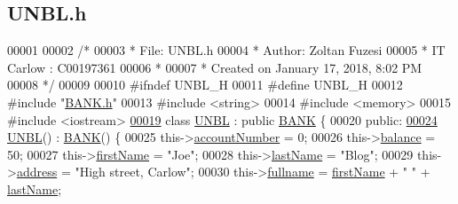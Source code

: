 \hypertarget{_u_n_b_l_8h_source}{}\subsection{U\+N\+B\+L.\+h}

\begin{DoxyCode}
00001 
00002 \textcolor{comment}{/* }
00003 \textcolor{comment}{ * File:   UNBL.h}
00004 \textcolor{comment}{ * Author: Zoltan Fuzesi}
00005 \textcolor{comment}{ * IT Carlow : C00197361}
00006 \textcolor{comment}{ *}
00007 \textcolor{comment}{ * Created on January 17, 2018, 8:02 PM}
00008 \textcolor{comment}{ */}
00009 
00010 \textcolor{preprocessor}{#ifndef UNBL\_H}
00011 \textcolor{preprocessor}{#define UNBL\_H}
00012 \textcolor{preprocessor}{#include "\hyperlink{_b_a_n_k_8h}{BANK.h}"}
00013 \textcolor{preprocessor}{#include <string>}
00014 \textcolor{preprocessor}{#include <memory>}
00015 \textcolor{preprocessor}{#include <iostream>}
\hypertarget{_u_n_b_l_8h_source.tex_l00019}{}\hyperlink{class_u_n_b_l}{00019} \textcolor{keyword}{class }\hyperlink{class_u_n_b_l}{UNBL} : \textcolor{keyword}{public} \hyperlink{class_b_a_n_k}{BANK} \{
00020 \textcolor{keyword}{public}:
\hypertarget{_u_n_b_l_8h_source.tex_l00024}{}\hyperlink{class_u_n_b_l_aa264ef64c453e6049b3d4c984d84d1de_aa264ef64c453e6049b3d4c984d84d1de}{00024}     \hyperlink{class_u_n_b_l_aa264ef64c453e6049b3d4c984d84d1de_aa264ef64c453e6049b3d4c984d84d1de}{UNBL}() : \hyperlink{class_b_a_n_k}{BANK}() \{
00025         this->\hyperlink{class_u_n_b_l_a90763c3044159862bcb9cd51d6b09f34_a90763c3044159862bcb9cd51d6b09f34}{accountNumber} = 0;
00026         this->\hyperlink{class_u_n_b_l_afbe674996d7fddaffb55654e6a79f03b_afbe674996d7fddaffb55654e6a79f03b}{balance} = 50;
00027         this->\hyperlink{class_u_n_b_l_acee1595bf1914ac220f7c810b174bd16_acee1595bf1914ac220f7c810b174bd16}{firstName} = \textcolor{stringliteral}{"Joe"};
00028         this->\hyperlink{class_u_n_b_l_a3f42790177cbe310536f53a7369ee194_a3f42790177cbe310536f53a7369ee194}{lastName} = \textcolor{stringliteral}{"Blog"};
00029         this->\hyperlink{class_u_n_b_l_acdaf39211e9b9c190a69bbbc590543e3_acdaf39211e9b9c190a69bbbc590543e3}{address} = \textcolor{stringliteral}{"High street, Carlow"};
00030         this->\hyperlink{class_u_n_b_l_a67deb62f553fe1ece6feb73f12898e7a_a67deb62f553fe1ece6feb73f12898e7a}{fullname} = \hyperlink{class_u_n_b_l_acee1595bf1914ac220f7c810b174bd16_acee1595bf1914ac220f7c810b174bd16}{firstName} + \textcolor{stringliteral}{" "} + \hyperlink{class_u_n_b_l_a3f42790177cbe310536f53a7369ee194_a3f42790177cbe310536f53a7369ee194}{lastName};

\end{DoxyCode}
